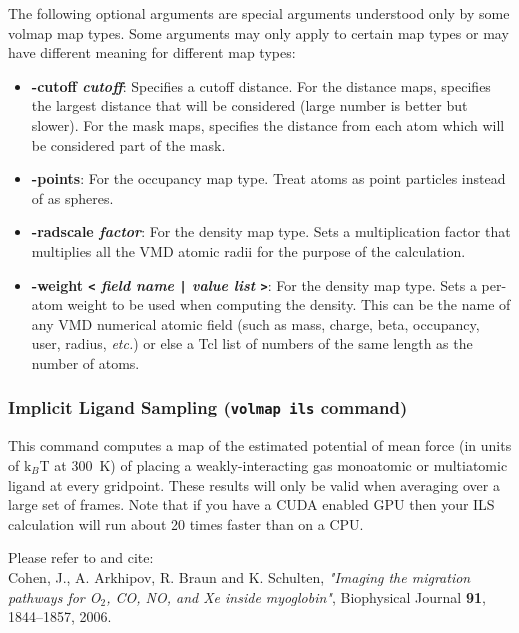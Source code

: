 The following optional arguments are special arguments understood only by some volmap map types. Some arguments may only apply to certain map types or may have different meaning for different map types:      

\begin{itemize}
  \item {\bf -cutoff {\it cutoff}}: Specifies a cutoff distance. For the
  distance maps, specifies the largest distance that will be considered (large
  number is better but slower). For the mask maps, specifies the distance from
  each atom which will be considered part of the mask.

  \item {\bf -points}: For the occupancy map type. Treat atoms as point
  particles instead of as spheres.
  
  \item {\bf -radscale {\it factor}}: For the density map type. Sets a
  multiplication factor that multiplies all the VMD atomic radii for the purpose
  of the calculation.

  \item {\bf -weight {\tt <} {\it field name} {\tt |} {\it value list} {\tt >}}:
  For the density map type. Sets a per-atom weight to be used when computing the
  density. This can be the name of any VMD numerical atomic field (such as mass,
  charge, beta, occupancy, user, radius, \emph{etc.}) or else a Tcl list of
  numbers of the same length as the number of atoms.

\end{itemize}


\subsubsection{Implicit Ligand Sampling ({\tt volmap ils} command)}
This command computes a map of the estimated potential of mean force (in
units of k$_B$T at 300~K) of placing a weakly-interacting gas monoatomic or
multiatomic ligand at every gridpoint. These results will only be valid when
averaging over a large set of frames.
Note that if you have a CUDA enabled GPU then your ILS calculation
will run about 20 times faster than on a CPU.

Please refer to and cite:\\
Cohen, J., A. Arkhipov, R. Braun and K. Schulten,  {\it "Imaging
the migration pathways for O$_2$, CO, NO, and Xe inside myoglobin"},
Biophysical Journal {\bf 91}, 1844--1857, 2006.\\


